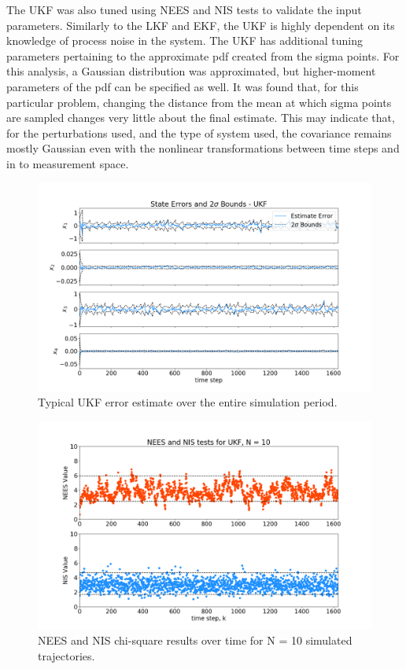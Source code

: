 \documentclass[11pt, a4paper]{article}
\begin{document}
The UKF was also tuned using NEES and NIS tests to validate the input parameters. 
Similarly to the LKF and EKF, the UKF is highly dependent on its knowledge of process noise in the system. 
The UKF has additional tuning parameters pertaining to the approximate pdf created from the sigma points. For this analysis, a Gaussian distribution was approximated, but higher-moment parameters of the pdf can be specified as well. 
It was found that, for this particular problem, changing the distance from the mean at which sigma points are sampled changes very little about the final estimate. 
This may indicate that, for the perturbations used, and the type of system used, the covariance remains mostly Gaussian even with the nonlinear transformations between time steps and in to measurement space.   


\begin{figure}[H]
	\centering
	\includegraphics[width=\textwidth]{Figures/ukf_estimate_th.png}
	\caption{Typical UKF error estimate over the entire simulation period.}
	\label{fig:ukf_est}
\end{figure}

\begin{figure}[H]
	\centering
	\includegraphics[width=\textwidth]{./Figures/NEESNIS_ukf_N10Q1.0E-09.png}
	\caption{NEES and NIS chi-square results over time for N = 10 simulated trajectories.}
	\label{fig:neesnis_ukf}
\end{figure}
\end{document}
